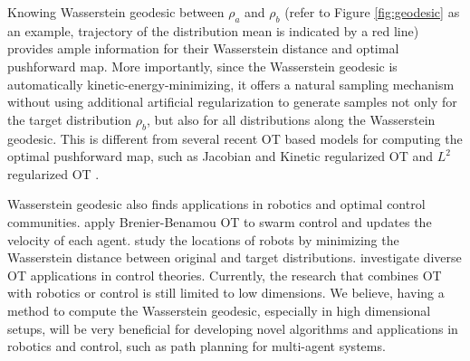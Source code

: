 \documentclass{article}
\newcommand{\zha}[1]{{\color{red} Zha: #1}}
\begin{document}
Knowing Wasserstein geodesic between $\rho_a$ and $\rho_b$ (refer to Figure \ref{fig:geodesic} as an example, trajectory of the distribution mean is indicated by a red line) provides ample information for their Wasserstein distance and optimal pushforward map. More importantly, since the Wasserstein geodesic is automatically kinetic-energy-minimizing, it offers a natural sampling mechanism without using additional artificial regularization to generate samples not only for the target distribution $\rho_b$, but also for all distributions along the Wasserstein geodesic. This is different from several recent OT based models for computing the optimal pushforward map, such as Jacobian and Kinetic regularized OT \citep{trainode} and $L^2$ regularized OT \citep{pfg}.  



Wasserstein geodesic also finds applications in robotics and optimal control communities. 
\citet{otrobotics1} apply Brenier-Benamou OT to swarm control and updates the velocity of each agent. \citet{otrobotics2} study the locations of robots by minimizing the Wasserstein distance between original and target distributions. \citet{otcontrol1, otcontrol2} investigate diverse OT applications in control theories. Currently, the research that combines OT with robotics or control is still limited to low dimensions. We believe, having a method to compute the Wasserstein geodesic, especially in high dimensional setups, will be very beneficial for developing novel algorithms and applications in robotics and control, such as path planning for multi-agent systems.   
\end{document}
